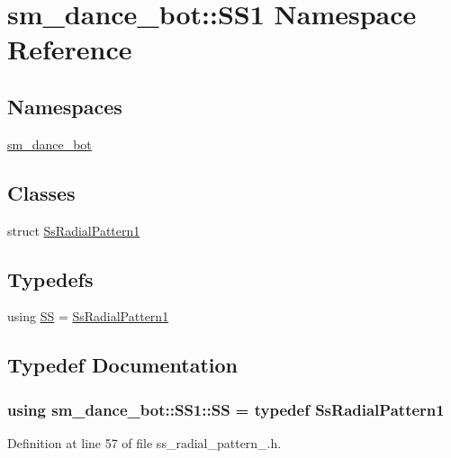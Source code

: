 \hypertarget{namespacesm__dance__bot_1_1SS1}{}\section{sm\+\_\+dance\+\_\+bot\+:\+:S\+S1 Namespace Reference}
\label{namespacesm__dance__bot_1_1SS1}
\subsection*{Namespaces}
\begin{DoxyCompactItemize}
\item 
 \hyperlink{namespacesm__dance__bot_1_1SS1_1_1sm__dance__bot}{sm\+\_\+dance\+\_\+bot}
\end{DoxyCompactItemize}
\subsection*{Classes}
\begin{DoxyCompactItemize}
\item 
struct \hyperlink{structsm__dance__bot_1_1SS1_1_1SsRadialPattern1}{Ss\+Radial\+Pattern1}
\end{DoxyCompactItemize}
\subsection*{Typedefs}
\begin{DoxyCompactItemize}
\item 
using \hyperlink{namespacesm__dance__bot_1_1SS1_a84fc38da71be89ddc4805298f7b82c66}{SS} = \hyperlink{structsm__dance__bot_1_1SS1_1_1SsRadialPattern1}{Ss\+Radial\+Pattern1}
\end{DoxyCompactItemize}


\subsection{Typedef Documentation}
\subsubsection[{\texorpdfstring{SS}{SS}}]{\setlength{\rightskip}{0pt plus 5cm}using {\bf sm\+\_\+dance\+\_\+bot\+::\+S\+S1\+::\+SS} = typedef {\bf Ss\+Radial\+Pattern1}}\hypertarget{namespacesm__dance__bot_1_1SS1_a84fc38da71be89ddc4805298f7b82c66}{}\label{namespacesm__dance__bot_1_1SS1_a84fc38da71be89ddc4805298f7b82c66}


Definition at line 57 of file ss\+\_\+radial\+\_\+pattern\+\_.\+h.

